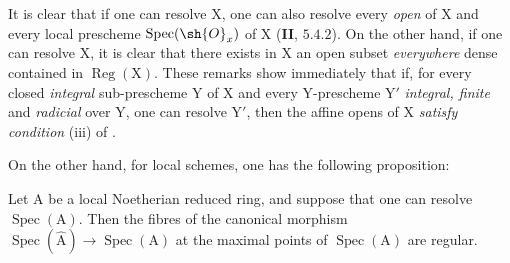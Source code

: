 \begin{env}[7.9.2]
\label{IV.7.9.2}
It is clear that if one can resolve $\mathrm{X}$, one can also resolve every \emph{open} of $\mathrm{X}$ and every local prescheme $\operatorname{Spec}(\sh{O}_x)$ of $\mathrm{X}$ (\textbf{II}, $5.4.2$). On the other hand, if one can resolve $\mathrm{X}$, it is clear that there exists in $\mathrm{X}$ an open subset \emph{everywhere} dense contained in $\operatorname{Reg}(\mathrm{X})$. These remarks show immediately that if, for every closed \emph{integral} sub-prescheme $\mathrm{Y}$ of $\mathrm{X}$ and every $\mathrm{Y}$-prescheme $\mathrm{Y}'$ \emph{integral, finite} and \emph{radicial} over $\mathrm{Y}$, one can resolve $\mathrm{Y}'$, then the affine opens of $\mathrm{X}$ \emph{satisfy condition} (iii) of .

On the other hand, for local schemes, one has the following proposition:
\end{env}

\begin{proposition}[7.9.3]
\label{IV.7.9.3}
Let $\mathrm{A}$ be a local Noetherian reduced ring, and suppose that one can resolve $\operatorname{Spec}(\mathrm{A})$. Then the fibres of the canonical morphism $\operatorname{Spec}(\widehat{\mathrm{A}})\to\operatorname{Spec}(\mathrm{A})$ at the maximal points of $\operatorname{Spec}(\mathrm{A})$ are regular.
\end{proposition}

